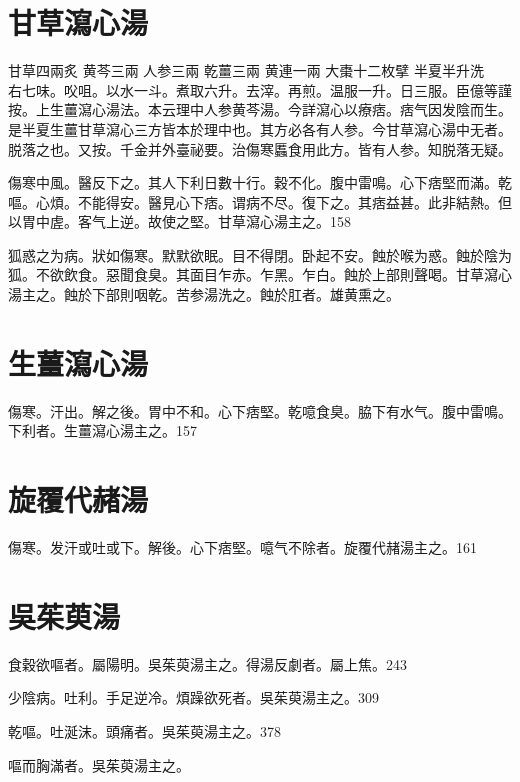 \section{甘草瀉心湯}

甘草{\scriptsize 四兩炙} 黄芩{\scriptsize 三兩} 人参{\scriptsize 三兩} 乾薑{\scriptsize 三兩} 黄連{\scriptsize 一兩} 大棗{\scriptsize 十二枚擘} 半夏{\scriptsize 半升洗}\\
右七味。㕮咀。以水一斗。煮取六升。去滓。再煎。温服一升。日三服。{\scriptsize 臣億等謹按。上生薑瀉心湯法。本云理中人参黄芩湯。今詳瀉心以療痞。痞气因发陰而生。是半夏生薑甘草瀉心三方皆本於理中也。其方必各有人参。今甘草瀉心湯中无者。脱落之也。又按。千金并外臺祕要。治傷寒䘌食用此方。皆有人参。知脱落无疑。}

傷寒中風。醫反下之。其人下利日數十行。穀不化。腹中雷鳴。心下痞堅而滿。乾嘔。心煩。不能得安。醫見心下痞。谓病不尽。復下之。其痞益甚。此非結熱。但以胃中虗。客气上逆。故使之堅。甘草瀉心湯主之。158

狐惑之为病。狀如傷寒。默默欲眠。目不得閉。卧起不安。蝕於喉为惑。蝕於陰为狐。不欲飲食。惡聞食臭。其面目乍赤。乍黑。乍白。蝕於上部則聲喝。甘草瀉心湯主之。蝕於下部則咽乾。苦参湯洗之。蝕於肛者。雄黄熏之。

\section{生薑瀉心湯}



傷寒。汗出。解之後。胃中不和。心下痞堅。乾噫食臭。脇下有水气。腹中雷鳴。下利者。生薑瀉心湯主之。157

\section{旋覆代赭湯}

傷寒。发汗{\khaaitp 或}吐{\khaaitp 或}下。解後。心下痞堅。噫气不除者。旋覆代赭湯主之。161

\section{吳茱萸湯}

食穀欲嘔者。屬陽明。{\khaaitp 吳}茱萸湯主之。得湯反劇者。屬上焦。243

少陰病。吐利。手足逆{\khaaitp 冷}。煩躁欲死者。{\khaaitp 吳}茱萸湯主之。309

乾嘔。吐涎沫。頭痛者。{\khaaitp 吳}茱萸湯主之。378

嘔而胸滿者。{\khaaitp 吳}茱萸湯主之。

